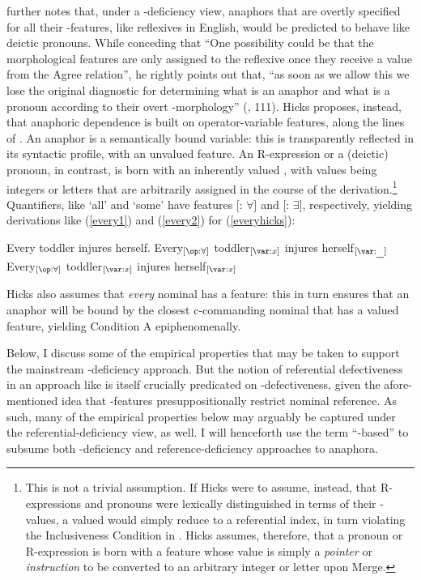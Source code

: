 \documentclass[output=paper, modfonts, nonflat]{langsci/langscibook}
\begin{document}
\noindent \citet{Hicks:2009} further notes that, under a \ph-deficiency view,
anaphors that are overtly specified for all their \ph-features, like
reflexives in English, would be predicted to behave like deictic
pronouns. While conceding that ``One possibility could be that the
morphological features are only assigned to the reﬂexive once they
receive a value from the Agree relation'', he rightly points out that,
``as soon as we allow this we lose the original diagnostic for
determining what is an anaphor and what is a pronoun according to
their overt \ph-morphology'' (\citealp{Hicks:2009}, 111).  Hicks
proposes, instead, that anaphoric dependence is built on
operator-variable features, along the lines of
\citet{adgerramchand:2005}. An anaphor is a semantically bound
variable: this is transparently reflected in its syntactic profile,
with an unvalued \var{} feature. An R-expression or a (deictic)
pronoun, in contrast, is born with an inherently valued \var, with
values being integers or letters that are arbitrarily assigned in the
course of the derivation.\footnote{This is not a trivial
  assumption. If Hicks were to assume, instead, that R-expressions and
  pronouns were lexically distinguished in terms of their \var-values,
  a valued \var{} would simply reduce to a referential index, in turn
  violating the Inclusiveness Condition in \citet[][381]{chomsky:1995}. Hicks assumes, therefore, that a pronoun or R-expression is
  born with a feature whose value is simply a \emph{pointer} or
  \emph{instruction} to be converted to an arbitrary integer or letter
  upon Merge.}  Quantifiers, like `all' and `some' have \op{} features
[\op: $\forall$] and [\op: $\exists$], respectively, yielding
derivations like (\ref{every1}) and (\ref{every2}) for
(\ref{everyhicks}):

\ea\label{everyhicks} Every toddler injures herself.
\ea\label{every1} Every$_{[\op:\forall]}$ toddler$_{[\var:x]}$ injures
herself$_{[\var:\ul{~~}]}$
\ex\label{every2} Every$_{[\op:\forall]}$ toddler$_{[\var:x]}$ injures
herself$_{[\var:x]}$ \z \z

\noindent Hicks also assumes that \emph{every} nominal has a \var{} feature:
this in turn ensures that an anaphor will be bound by the closest
c-commanding nominal that has a valued \var{} feature, yielding
Condition A epiphenomenally.
  
Below, I discuss some of the empirical properties that may be taken to
support the mainstream \ph-deficiency approach. But the notion of
referential defectiveness in an approach like \citet{Hicks:2009} is
itself crucially predicated on \ph-defectiveness, given the
afore-mentioned idea that \ph-features presuppositionally restrict
nominal reference. As such, many of the empirical properties below may
arguably be captured under the referential-deficiency view, as well. I
will henceforth use the term ``\ph-based'' to subsume both
\ph-deficiency and reference-deficiency approaches to anaphora.
\end{document}
